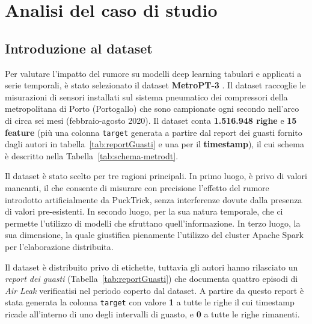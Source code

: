 \documentclass[../main.tex]{subfiles}
\begin{document}
\chapter{Analisi del caso di studio}
\label{chap:DatasetAnalysis}

\section{Introduzione al dataset}

Per valutare l'impatto del rumore su modelli deep learning tabulari e applicati a serie temporali, è stato selezionato il dataset \textbf{MetroPT-3} \cite{MetroDT}. Il dataset raccoglie le misurazioni di sensori installati sul sistema pneumatico dei compressori della metropolitana di Porto (Portogallo) che sono campionate ogni secondo nell'arco di circa sei mesi (febbraio-agosto 2020). Il dataset conta \textbf{1.516.948 righe} e \textbf{15 feature} (più una colonna \texttt{target} generata a partire dal report dei guasti fornito dagli autori in tabella~\ref{tab:reportGuasti} e una per il \textbf{timestamp}), il cui schema è descritto nella Tabella~\ref{tab:schema-metrodt}.

Il dataset è stato scelto per tre ragioni principali. In primo luogo, è privo di valori mancanti, il che consente di misurare con precisione l'effetto del rumore introdotto artificialmente da PuckTrick, senza interferenze dovute dalla presenza di valori pre-esistenti. In secondo luogo, per la sua natura temporale, che ci permette l'utilizzo di modelli che sfruttano quell'informazione. In terzo luogo, la sua dimensione, la quale giustifica pienamente l'utilizzo del cluster Apache Spark per l'elaborazione distribuita.

Il dataset è distribuito privo di etichette, tuttavia gli autori hanno rilasciato un \textit{report 
dei guasti} (Tabella~\ref{tab:reportGuasti}) che documenta quattro episodi di \textit{Air Leak} verificatisi nel periodo coperto dal dataset. A partire da questo report è stata generata la colonna \texttt{target} con valore \textbf{1} a tutte le righe il cui timestamp ricade all'interno di uno degli intervalli di guasto, e \textbf{0} a tutte le righe rimanenti. 
\end{document}
